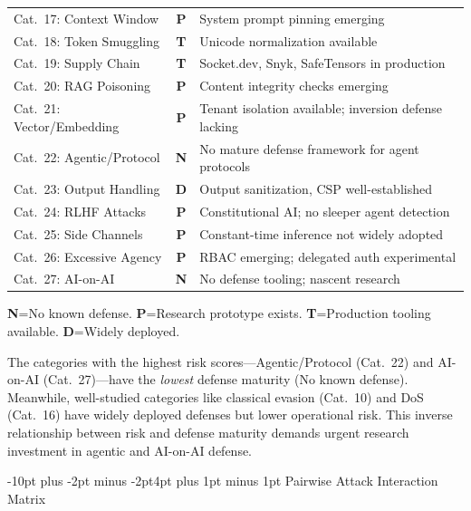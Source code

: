 \documentclass[conference]{IEEEtran}
\makeatletter
\renewcommand{\section}{\@startsection{section}{1}{\z@}%
  {-10pt plus -2pt minus -2pt}{4pt plus 1pt minus 1pt}%
  {\normalfont\large\bfseries\sffamily\color{accentdark}}}
\makeatother
\begin{document}
\begin{table}[!htbp]
\begin{tabular}{p{2.5cm}cp{3.5cm}}
\rowcolor{rowalt} Cat.\ 17: Context Window & \textbf{P} & System prompt pinning emerging \\
Cat.\ 18: Token Smuggling & \textbf{T} & Unicode normalization available \\
\rowcolor{rowalt} Cat.\ 19: Supply Chain & \textbf{T} & Socket.dev, Snyk, SafeTensors in production \\
Cat.\ 20: RAG Poisoning & \textbf{P} & Content integrity checks emerging \\
\rowcolor{rowalt} Cat.\ 21: Vector/Embedding & \textbf{P} & Tenant isolation available; inversion defense lacking \\
Cat.\ 22: Agentic/Protocol & \textbf{N} & No mature defense framework for agent protocols \\
\rowcolor{rowalt} Cat.\ 23: Output Handling & \textbf{D} & Output sanitization, CSP well-established \\
Cat.\ 24: RLHF Attacks & \textbf{P} & Constitutional AI; no sleeper agent detection \\
\rowcolor{rowalt} Cat.\ 25: Side Channels & \textbf{P} & Constant-time inference not widely adopted \\
Cat.\ 26: Excessive Agency & \textbf{P} & RBAC emerging; delegated auth experimental \\
\rowcolor{rowalt} Cat.\ 27: AI-on-AI & \textbf{N} & No defense tooling; nascent research \\
\bottomrule
\end{tabular}
\par\vspace{3pt}
{\scriptsize\sffamily\color{gray} \textbf{N}=No known defense. \textbf{P}=Research prototype exists. \textbf{T}=Production tooling available. \textbf{D}=Widely deployed.}
\end{table}

\begin{tcolorbox}[keyfinding, title={Key Finding: Defense Gaps in Highest-Risk Categories}]
The categories with the highest risk scores---Agentic/Protocol (Cat.~22) and AI-on-AI (Cat.~27)---have the \emph{lowest} defense maturity (No known defense). Meanwhile, well-studied categories like classical evasion (Cat.~10) and DoS (Cat.~16) have widely deployed defenses but lower operational risk. This inverse relationship between risk and defense maturity demands urgent research investment in agentic and AI-on-AI defense.
\end{tcolorbox}


\section{Pairwise Attack Interaction Matrix}\label{sec:interaction}
\end{document}
